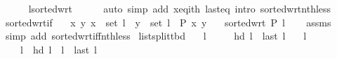 \begin{isabellebody}
\ \ \ \ \isamarkupfalse%
\ l{\isacharunderscore}{\kern0pt}sorted{\isacharunderscore}{\kern0pt}wrt\isanewline
\ \ \ \ \isamarkupfalse%
\ {\isacharparenleft}{\kern0pt}auto\ simp\ add{\isacharcolon}{\kern0pt}\ x{\isacharunderscore}{\kern0pt}eq{\isacharunderscore}{\kern0pt}ith\ last{\isacharunderscore}{\kern0pt}eq\ intro{\isacharcolon}{\kern0pt}\ sorted{\isacharunderscore}{\kern0pt}wrt{\isacharunderscore}{\kern0pt}nth{\isacharunderscore}{\kern0pt}less{\isacharparenright}{\kern0pt}\isanewline
{}\isamarkupfalse%
%
\endisatagproof
{\isafoldproof}%
%
\isadelimproof
\isanewline
%
\endisadelimproof
\isanewline
{}\isamarkupfalse%
\ sorted{\isacharunderscore}{\kern0pt}wrt{\isacharunderscore}{\kern0pt}if{\isacharcolon}{\kern0pt}\isanewline
\ \ \ {\isachardoublequoteopen}{\isasymAnd}x\ y{\isachardot}{\kern0pt}\ x\ {\isasymin}\ set\ l\ {\isasymLongrightarrow}\ y\ {\isasymin}\ set\ l\ {\isasymLongrightarrow}\ P\ x\ y{\isachardoublequoteclose}\isanewline
\ \ \ {\isachardoublequoteopen}sorted{\isacharunderscore}{\kern0pt}wrt\ P\ l{\isachardoublequoteclose}\isanewline
%
\isadelimproof
\ \ %
\endisadelimproof
%
\isatagproof
{}\isamarkupfalse%
\ assms\isanewline
\ \ \isamarkupfalse%
\ {\isacharparenleft}{\kern0pt}simp\ add{\isacharcolon}{\kern0pt}\ sorted{\isacharunderscore}{\kern0pt}wrt{\isacharunderscore}{\kern0pt}iff{\isacharunderscore}{\kern0pt}nth{\isacharunderscore}{\kern0pt}less{\isacharparenright}{\kern0pt}%
\endisatagproof
{\isafoldproof}%
%
\isadelimproof
%
\endisadelimproof
%
\isadelimdocument
%
\endisadelimdocument
%
\isatagdocument
%
\isamarkupsubsection{%
}
\isamarkuptrue%
%
\endisatagdocument
{\isafolddocument}%
%
\isadelimdocument
%
\endisadelimdocument
{}\isamarkupfalse%
\ list{\isacharunderscore}{\kern0pt}split{\isacharunderscore}{\kern0pt}tbd{\isacharcolon}{\kern0pt}\isanewline
\ \ \ {\isachardoublequoteopen}l\ {\isasymnoteq}\ {\isacharbrackleft}{\kern0pt}{\isacharbrackright}{\kern0pt}{\isachardoublequoteclose}\isanewline
\ \ \ {\isachardoublequoteopen}hd\ l\ {\isasymnoteq}\ last\ l{\isachardoublequoteclose}\isanewline
\ \ \ l{\isacharprime}{\kern0pt}\ \isanewline
\ \ \ \ {\isachardoublequoteopen}l\ {\isacharequal}{\kern0pt}\ hd\ l\ {\isacharhash}{\kern0pt}\ l{\isacharprime}{\kern0pt}\ {\isacharat}{\kern0pt}\ {\isacharbrackleft}{\kern0pt}last\ l{\isacharbrackright}{\kern0pt}{\isachardoublequoteclose}\isanewline
%
\isadelimproof
%
\endisadelimproof

\end{isabellebody}
